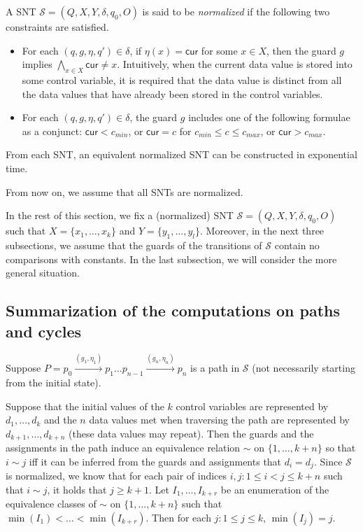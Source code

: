 \documentclass[runningheads,a4paper]{llncs}
\def\Ss{{\mathcal{S} }}
\newcommand\cur{\mathsf{cur}}
\begin{document}
A SNT $\Ss=(Q,X,Y,\delta,q_0,O)$ is said to be \emph{normalized} if the following two constraints are satisfied.
\begin{itemize}
\item For each $(q,g,\eta,q') \in \delta$, if $\eta(x)=\cur$ for some $x \in X$, then the guard $g$ implies $\bigwedge \limits_{x \in X} \cur \neq x$.  Intuitively, when the current data value is stored into some control variable, it is required that the data value is distinct from all the data values that have already been stored in the control variables.
%
\item For each $(q, g, \eta, q') \in \delta$, the guard $g$ includes one of the following formulae as a conjunct: $\cur < c_{min}$, or $\cur = c$ for $c_{min} \le c \le c_{max}$, or $\cur > c_{max}$.
\end{itemize}


\begin{proposition}\label{prop-snt-norm}
From each SNT, an equivalent normalized SNT can be constructed in exponential time. 
\end{proposition}

From now on, we assume that all SNTs are normalized. 

In the rest of this section, we fix a (normalized) SNT $\Ss = (Q,X,Y,\delta,q_0,O)$ such that $X=\{ x_1,\dots, x_k\}$ and $Y = \{y_1,\dots,y_l\}$. Moreover, in the next three subsections, we assume that the guards of the transitions of $\Ss$ contain no comparisons with constants. In the last subsection, we will consider the more general situation. 


\subsection{Summarization of the computations on paths and cycles}

Suppose $P=p_0 \xrightarrow{(g_1,\eta_1)} p_1 \dots p_{n-1} \xrightarrow{(g_n,\eta_n)} p_{n}$ is a path in $\Ss$ (not necessarily starting from the initial state). 

Suppose that the initial values of the $k$ control variables are represented by $d_1,\dots, d_k$ and the $n$ data values met when traversing the path are represented by $d_{k+1},\dots,d_{k+n}$ (these data values may repeat). Then the guards and the assignments in the path induce an equivalence relation $\sim$ on $\{1,\dots, k+n\}$ so that  $i \sim j$ iff it can be inferred from the guards and assignments that $d_i = d_j$. Since $\Ss$ is normalized, we know that for each pair of indices $i,j: 1 \le i < j \le k+n$ such that $i \sim j$, it holds that $j \ge k+1$. Let $I_1,\dots, I_{k+r}$ be an enumeration of the equivalence classes of $\sim$ on $\{1,\dots, k+n\}$ such that $\min(I_1) < \dots < \min(I_{k+r})$. Then for each $j: 1 \le j \le k$, $\min(I_j)=j$.
\end{document}

